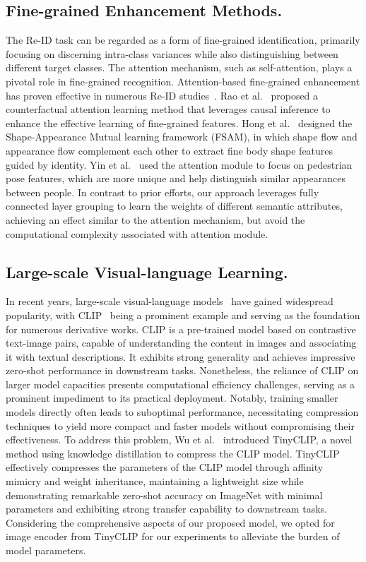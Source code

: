 \subsection{Fine-grained Enhancement Methods.}
The Re-ID task can be regarded as a form of fine-grained identification, primarily focusing on discerning intra-class variances while also distinguishing between different target classes. The attention mechanism, such as self-attention, plays a pivotal role in fine-grained recognition. Attention-based fine-grained enhancement has proven effective in numerous Re-ID studies~\cite{rao2021counterfactual,hong2021fine,yin2020fine,zhu2022dual}. Rao et al.~\cite{rao2021counterfactual} proposed a counterfactual attention learning method that leverages causal inference to enhance the effective learning of fine-grained features. 
Hong et al.~\cite{hong2021fine} designed the Shape-Appearance Mutual learning framework (FSAM), in which shape flow and appearance flow complement each other to extract fine body shape features guided by identity. 
Yin et al.~\cite{yin2020fine} used the attention module to focus on pedestrian pose features, which are more unique and help distinguish similar appearances between people.
In contrast to prior efforts, our approach leverages fully connected layer grouping to learn the weights of different semantic attributes, achieving an effect similar to the attention mechanism, but avoid the computational complexity associated with attention module.

\subsection{Large-scale Visual-language Learning.}
In recent years, large-scale visual-language models~\cite{jia2021scaling, li2022blip, li2021align, radford2021learning} have gained widespread popularity, with CLIP~\cite{radford2021learning} being a prominent example and serving as the foundation for numerous derivative works. CLIP is a pre-trained model based on contrastive text-image pairs, capable of understanding the content in images and associating it with textual descriptions. It exhibits strong generality and achieves impressive zero-shot performance in downstream tasks. Nonetheless, the reliance of CLIP on larger model capacities presents computational efficiency challenges, serving as a prominent impediment to its practical deployment. Notably, training smaller models directly often leads to suboptimal performance, necessitating compression techniques to yield more compact and faster models without compromising their effectiveness.
To address this problem, Wu et al.~\cite{wu2023tinyclip} introduced TinyCLIP, a novel method using knowledge distillation to compress the CLIP model. TinyCLIP effectively compresses the parameters of the CLIP model through affinity mimicry and weight inheritance, maintaining a lightweight size while demonstrating remarkable zero-shot accuracy on ImageNet with minimal parameters and exhibiting strong transfer capability to downstream tasks.
Considering the comprehensive aspects of our proposed model, we opted for image encoder from TinyCLIP for our experiments to alleviate the burden of model parameters.

